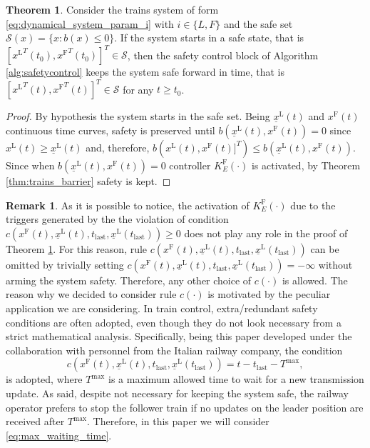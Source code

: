 \documentclass[letterpaper, 10 pt, conference]{ieeeconf}
\theoremstyle{definition}
\theoremstyle{nopoint}
\newtheorem*{remark}{Remark}
\newtheorem{theorem}{Theorem}[section]
\newcounter{Theorem}
\begin{document}
\begin{theorem}\label{thm:safetycontrol} 
Consider the trains system of form \eqref{eq:dynamical_system_param_i} with $i\in\{L,F\}$ and the safe set $\mathcal{S}(x)=\{x: b(x)\leq 0\}$. 
If the system starts in a safe state, that is $[{x^\mathrm{L}}^T(t_0),{x^\mathrm{F}}^T(t_0)]^T\in\mathcal{S}$, then the safety control block of Algorithm \ref{alg:safetycontrol} keeps the system safe forward in time, that is $[{x^\mathrm{L}}^T(t),{x^\mathrm{F}}^T(t)]^T\in\mathcal{S}$ for any $t\geq t_0$.
\begin{proof}
By hypothesis the system starts in the safe set. Being $\underline{x}^\mathrm{L}(t)$ and ${x^\mathrm{F}}(t)$ continuous time curves,  safety is preserved until $b({\underline{x}^\mathrm{L}}(t),{x^\mathrm{F}}(t))=0$ since $x^\mathrm{L}(t)\geq  \underline{x}^\mathrm{L}(t)$ and, therefore,  $b({x^\mathrm{L}}(t),{x^\mathrm{F}}(t)]^T)\leq b({\underline{x}^\mathrm{L}}(t),{x^\mathrm{F}}(t))$. Since when $b({\underline{x}^\mathrm{L}}(t),{x^\mathrm{F}}(t))=0$ controller $K_E^\mathrm{F}(\cdot)$ is activated, by Theorem \ref{thm:trains_barrier} safety is kept. 
\end{proof}
\end{theorem}

\begin{remark}
As it is possible to notice, the activation of $K_E^\mathrm{F}(\cdot)$ due to the triggers generated by the 
the violation of condition $c(x^\mathrm{F}(t),\underline{x}^\mathrm{L}(t),t_{\mathrm{last}},\underline{x}^\mathrm{L}(t_{\mathrm{last}})) \geq 0$
does not play any role in the proof of Theorem \ref{thm:safetycontrol}. For this reason, rule $c(x^\mathrm{F}(t),\underline{x}^\mathrm{L}(t),t_{\mathrm{last}},\underline{x}^\mathrm{L}(t_{\mathrm{last}}))$ can be omitted by trivially setting $c(x^\mathrm{F}(t),\underline{x}^\mathrm{L}(t),t_{\mathrm{last}},\underline{x}^\mathrm{L}(t_{\mathrm{last}}))=-\infty$ without arming the system safety. Therefore, any other choice of $c(\cdot)$ is allowed. 
The reason why we decided to consider rule $c(\cdot)$ is motivated by the peculiar application we are considering. In train control, extra/redundant safety conditions are often adopted, even though they do not look necessary from a strict mathematical analysis. 
Specifically, being this paper developed under the collaboration with personnel from the Italian railway company, the condition
\begin{equation}\label{eq:max_waiting_time}
c(x^\mathrm{F}(t),\underline{x}^\mathrm{L}(t),t_{\mathrm{last}},\underline{x}^\mathrm{L}(t_{\mathrm{last}}))= t-t_{\mathrm{last}}-T^{\max},
\end{equation}
is adopted, where $T^{\max}$ is a maximum allowed time to wait for a new transmission update. 
As said, despite not necessary for keeping the system safe, the railway operator prefers to stop the follower train if no updates on the leader position are received after $T^{\max}$. Therefore, in this paper we will consider \eqref{eq:max_waiting_time}.
\end{remark}
\end{document}
